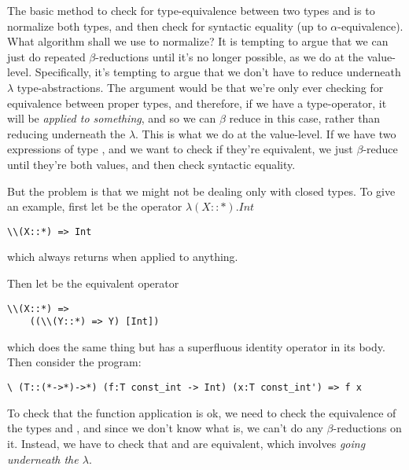 \documentclass[pageno]{jpaper}
\begin{document}
{{{The basic method to check for type-equivalence between two types  and  is to normalize
both types, and then check for syntactic equality (up to $\alpha$-equivalence).
What algorithm shall we use to normalize? 
It is tempting to argue that we can just do repeated $\beta$-reductions until
it's no longer possible, as we do at the value-level. Specifically, it's tempting to argue that we don't
have to reduce underneath $\lambda$ type-abstractions. The argument would be that we're only ever checking
for equivalence between proper types, and therefore, if we have a type-operator, it will be \textit{applied to something}, and so we can $\beta$ reduce in this case, rather than reducing underneath the $\lambda$.
This is what we do at the value-level. If we have two expressions of type , and we want to check
if they're equivalent, we just $\beta$-reduce until they're both values, and then check syntactic equality.

But the problem is that we might not be dealing only with closed types. To give an example, first let
 be the operator $\lambda (X::*). Int$
\begin{lstlisting}
\\(X::*) => Int
\end{lstlisting}

which always returns  when applied to anything.

Then let  be the equivalent operator
\begin{lstlisting}
\\(X::*) =>
    ((\\(Y::*) => Y) [Int])
\end{lstlisting}

which does the same thing but has a superfluous identity operator in its body.
Then consider the program:
\begin{lstlisting}
\ (T::(*->*)->*) (f:T const_int -> Int) (x:T const_int') => f x
\end{lstlisting}

To check that the function application  is ok, we need to check the equivalence of the types
 and , and since we don't know what  is, we can't do any
$\beta$-reductions on it. Instead, we have to check that  and  are equivalent,
which involves \textit{going underneath the $\lambda$}.

}}}
\end{document}
